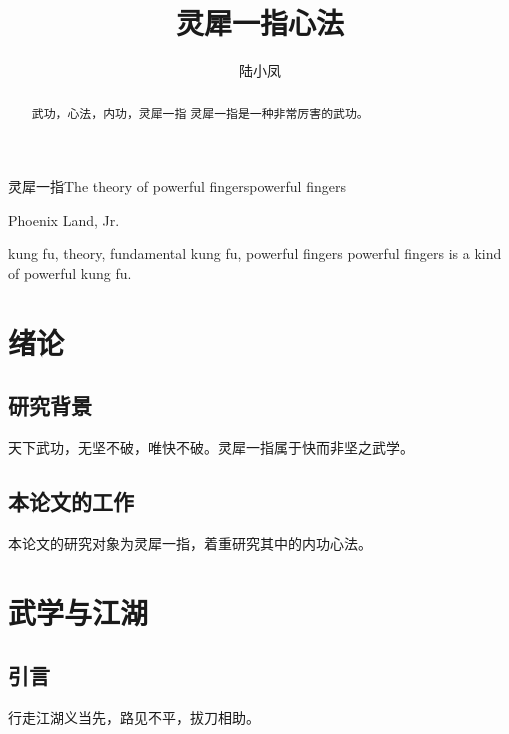 \documentclass[algorithmlist, figurelist,tablelist, nomlist,engineering]{seuthesix}
\begin{document}
\title{灵犀一指心法}{灵犀一指}{The theory of powerful fingers}{powerful fingers}
\author{陆小凤}{Phoenix Land, Jr.}
\authorizedate{\today}
\makebigcover
\makecover
\begin{abstract}{武功，心法，内功，灵犀一指}
灵犀一指是一种非常厉害的武功。
\end{abstract}

\begin{englishabstract}{kung fu, theory, fundamental kung fu, powerful fingers}
 powerful fingers is a kind of powerful kung fu.
\end{englishabstract}

\tableofcontents
\listofothers

\mainmatter

\chapter{绪论}
\section{研究背景}
天下武功，无坚不破，唯快不破。灵犀一指属于快而非坚之武学。


\section{本论文的工作}
本论文的研究对象为灵犀一指，着重研究其中的内功心法。



\chapter{武学与江湖}

\section{引言}
行走江湖义当先，路见不平，拔刀相助。
\end{document}
